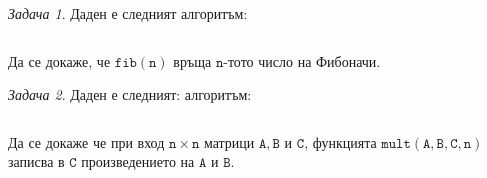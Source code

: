 \documentclass{article}
\theoremstyle{definition}
\theoremstyle{plain}
\theoremstyle{remark}
\newtheorem{problem}{Задача}
\theoremstyle{definition}
\begin{document}
\begin{problem}
Даден е следният алгоритъм:
\inputminted[linenos]{c++}{algorithms/fibonacci.cpp}

Да се докаже, че $\mathtt{fib(n)}$ връща $\mathtt{n}$-тото число на Фибоначи.
\end{problem}

\begin{problem}
Даден е следният: алгоритъм:
\inputminted[linenos]{c++}{algorithms/mult.cpp}

Да се докаже че при вход $\mathtt{n \times n}$ матрици $\mathtt{A, B}$ и $\mathtt{C}$, функцията $\mathtt{mult(A, B, C, n)}$ записва в $\mathtt{C}$ произведението на $\mathtt{A}$ и $\mathtt{B}$.
\end{problem}
\end{document}
